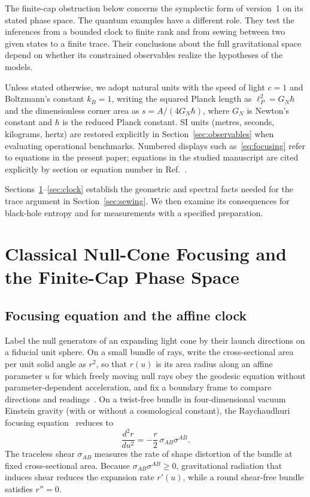 \documentclass[10pt,a4paper]{article}
\numberwithin{equation}{section}
\begin{document}
The finite-cap obstruction below concerns the symplectic form of version~1 on its stated phase space. The quantum examples have a different role. They test the inferences from a bounded clock to finite rank and from sewing between two given states to a finite trace. Their conclusions about the full gravitational space depend on whether its constrained observables realize the hypotheses of the models.

Unless stated otherwise, we adopt natural units with the speed of light $c=1$ and Boltzmann's constant $k_B=1$, writing the squared Planck length as $\ell_P^2=G_N\hbar$ and the dimensionless corner area as $s=A/(4G_N\hbar)$, where $G_N$ is Newton's constant and $\hbar$ is the reduced Planck constant.
SI units (metres, seconds, kilograms, hertz) are restored explicitly in Section~\ref{sec:observables} when evaluating operational benchmarks.
Numbered displays such as~\eqref{eq:focusing} refer to equations in the present paper; equations in the studied manuscript are cited explicitly by section or equation number in Ref.~\cite{Chandrasekaran2026}.

Sections~\ref{sec:classical}--\ref{sec:clock} establish the geometric and spectral facts needed for the trace argument in Section~\ref{sec:sewing}. We then examine its consequences for black-hole entropy and for measurements with a specified preparation.

\section{Classical Null-Cone Focusing and the Finite-Cap Phase Space}
\label{sec:classical}

\subsection{Focusing equation and the affine clock}

Label the null generators of an expanding light cone by their launch directions on a fiducial unit sphere.
On a small bundle of rays, write the cross-sectional area per unit solid angle as $r^2$, so that $r(u)$ is its area radius along an affine parameter $u$ for which freely moving null rays obey the geodesic equation without parameter-dependent acceleration, and fix a boundary frame to compare directions and readings~\cite{Reisenberger2008,Reisenberger2013,ChandrasekaranFlanagan2023}.
On a twist-free bundle in four-dimensional vacuum Einstein gravity (with or without a cosmological constant), the Raychaudhuri focusing equation~\cite{Raychaudhuri1955,Sachs1961} reduces to
\begin{equation}
  \frac{d^2 r}{du^2} = -\frac{r}{2}\,\sigma_{AB}\sigma^{AB}.
  \label{eq:focusing}
\end{equation}
The traceless shear $\sigma_{AB}$ measures the rate of shape distortion of the bundle at fixed cross-sectional area.
Because $\sigma_{AB}\sigma^{AB}\ge 0$, gravitational radiation that induces shear reduces the expansion rate $r'(u)$, while a round shear-free bundle satisfies $r''=0$.
\end{document}

